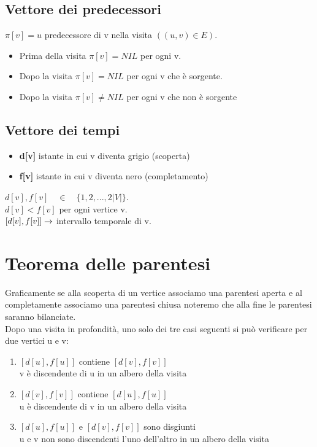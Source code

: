 \subsection{Vettore dei predecessori}
$\pi[v]=u$ \ra predecessore di v nella visita $((u,v)\in E)$.
\begin{itemize}
    \item Prima della visita \ra $\pi[v] = NIL$ per ogni v.
    \item Dopo la visita \ra $\pi[v] = NIL$ per ogni v che è sorgente.
    \item Dopo la visita \ra $\pi[v] \neq NIL$ per ogni v che non è sorgente
\end{itemize}
\subsection{Vettore dei tempi}
\begin{itemize}
    \item \textbf{d[v]} \ra istante in cui v diventa grigio (scoperta)
    \item \textbf{f[v]} \ra istante in cui v diventa nero (completamento)
\end{itemize}
$d[v], f[v] \quad \in \quad \{1,2,...,2|V|\}$.\\
$d[v] < f[v]$ per ogni vertice v.\\
$[d[v], f[v]] \rightarrow$ intervallo temporale di v.
\section{Teorema delle parentesi}
Graficamente se alla scoperta di un vertice associamo una parentesi aperta e
al completamente associamo una parentesi chiusa noteremo che alla fine le parentesi saranno
bilanciate.\\
Dopo una visita in profondità, uno solo dei tre casi seguenti si può verificare per
due vertici u e v:
\begin{enumerate}
    \item $[d[u],f[u]]$ contiene $[d[v],f[v]]$\\
    \ra v è discendente di u in un albero della visita
    \item $[d[v],f[v]]$ contiene $[d[u],f[u]]$\\
    \ra u è discendente di v in un albero della visita
    \item $[d[u],f[u]]$ e $[d[v],f[v]]$ sono disgiunti\\
    \ra u e v non sono discendenti l'uno dell'altro in un albero della visita
\end{enumerate}
